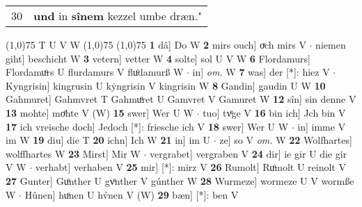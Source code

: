 \documentclass[8pt,a4paper,notitlepage]{article}
\begin{document}
\begin{table}[ht]
\begin{minipage}[t]{0.5\linewidth}
\begin{tabular}{rl}
30 & \textbf{und} in \textbf{sînem} kezzel umbe dræn."\\ 
\end{tabular}
\scriptsize
\line(1,0){75} \newline
T U V W \newline
\line(1,0){75} \newline
\newline
\line(1,0){75} \newline
\textbf{1} dâ] Do W \textbf{2} mirs ouch] oͮch mirs V  $\cdot$ niemen giht] beschicht W \textbf{3} vetern] vetter W \textbf{4} solte] sol U V W \textbf{6} Flordamurs] Flordamuͦrs U flurdamurs V fluͦdamurß W  $\cdot$ in] \textit{om.} W \textbf{7} was] der [*]: hiez V  $\cdot$ Kyngrisin] kingrusin U kẏngrisin V kingrisin W \textbf{8} Gandin] gaudin U W \textbf{10} Gahmuret] Gahmvret T Gahmuͦret U Gamvret V Gamuret W \textbf{12} sîn] sin denne V \textbf{13} mohte] moͤhte V (W) \textbf{15} swer] Wer U W  $\cdot$ tuo] tvͤge V \textbf{16} bin ich] Jch bin V \textbf{17} ich vreische doch] Jedoch [*]: friesche ich V \textbf{18} swer] Wer U W  $\cdot$ in] imme V im W \textbf{19} diu] die T \textbf{20} ichn] Ich W \textbf{21} in] im U  $\cdot$ ze] so V \textit{om.} W \textbf{22} Wolfhartes] wolffhartes W \textbf{23} Mirst] Mir W  $\cdot$ vergrabet] vergraben V \textbf{24} dir] ie gir U die gir V W  $\cdot$ verhabt] verhaben V \textbf{25} mir] [*]: mirz V \textbf{26} Rumolt] Ruͦmolt U reinolt V \textbf{27} Gunter] Guͦnther U gvͦnther V gúnther W \textbf{28} Wurmeze] wormeze U V wormße W  $\cdot$ Hûnen] huͦnen U hv́nen V (W) \textbf{29} bæn] [*]: ben V \newline
\end{minipage}
\end{table}
\end{document}
